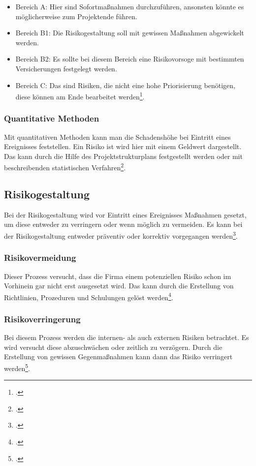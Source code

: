 \begin{itemize}
	\item Bereich A: Hier sind Sofortmaßnahmen durchzuführen, ansonsten könnte es möglicherweise zum Projektende führen.
	\item Bereich B1: Die Risikogestaltung soll mit gewissen Maßnahmen abgewickelt werden.
	\item Bereich B2: Es sollte bei diesem Bereich eine Risikovorsoge mit bestimmten Versicherungen festgelegt werden.
	\item Bereich C: Das sind Risiken, die nicht eine hohe Priorisierung benötigen, diese können am Ende bearbeitet werden\footcite{risikomanagement-diplomarbeit}.
\end{itemize}

\subsubsection{Quantitative Methoden}
Mit quantitativen Methoden kann man die Schadenshöhe bei Eintritt eines Ereignisses feststellen. Ein Risiko ist wird hier mit einem Geldwert dargestellt.
Das kann durch die Hilfe des Projektstrukturplans festgestellt werden oder mit beschreibenden statistischen Verfahren\footcite{risikomanagement-diplomarbeit}.


\subsection{Risikogestaltung}
Bei der Risikogestaltung wird vor Eintritt eines Ereignisses Maßnahmen gesetzt, um diese entweder zu verringern oder wenn möglich zu vermeiden.
Es kann bei der Risikogestaltung entweder präventiv oder korrektiv vorgegangen werden\footcite{risikomanagement-diplomarbeit}.

\subsubsection{Risikovermeidung}
Dieser Prozess versucht, dass die Firma einem potenziellen Risiko schon im Vorhinein gar nicht erst ausgesetzt wird. Das kann durch die Erstellung von Richtlinien, Prozeduren und Schulungen gelöst werden\footcite{risikomanagement-diplomarbeit}.

\subsubsection{Risikoverringerung}
Bei diesem Prozess werden die internen- als auch externen Risiken betrachtet. Es wird versucht diese abzuschwächen oder zeitlich zu verzögern. Durch die Erstellung von gewissen Gegenmaßnahmen kann dann das Risiko verringert werden\footcite{risikomanagement-diplomarbeit}.

